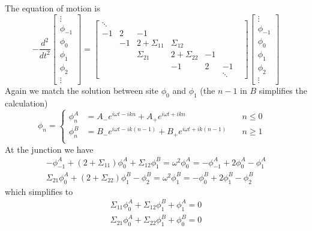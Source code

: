 \documentclass{article}
\begin{document}
The equation of motion is
\begin{equation}
-\frac{d^2}{dt^2} 
\begin{bmatrix}
\vdots\\
\phi_{-1}\\
\phi_0\\
\phi_1\\
\phi_2\\
\vdots 
\end{bmatrix}
 =  
\begin{bmatrix}
\ddots & & & & &\\
-1 & 2 & -1 & & &  \\
&-1 & 2 + \Sigma_{11} & \Sigma_{12} & & &\\ 
& & \Sigma_{21} & 2 + \Sigma_{22} & -1 & &\\
& & & -1 & 2 & -1 & \\
& & & & & \ddots &
\end{bmatrix}
\begin{bmatrix}
\vdots\\
\phi_{-1}\\
\phi_0\\
\phi_1\\
\phi_2\\
\vdots 
\end{bmatrix}
\end{equation}
Again we match the solution between site $\phi_0$ and $\phi_1$ (the $n -1$ in $B$ simplifies the calculation)
\begin{equation}
\phi_n
= \left\lbrace
  \begin{aligned}
    \phi_n^A &= A_{-} e^{i \omega t  - ikn}  + A_{+} e^{i \omega t  + ikn}  & \quad  n \le 0 \\
    \phi_n^B &= B_{-} e^{i \omega t  - ik(n-1)}  + B_{+} e^{i \omega t  + ik(n-1)} & \quad n \ge 1 \\
  \end{aligned} \right. 
 \quad 
\end{equation}
At the junction we have
\begin{equation}
\begin{aligned}
- \phi_{-1}^A + ( 2+ \Sigma_{11} ) \phi_{0}^A + \Sigma_{12} \phi_1^B =  \omega^2 \phi_0^A = - \phi_{-1}^A + 2 \phi_{0}^A - \phi_1^A\\
\Sigma_{21} \phi_0^A + ( 2 + \Sigma_{22}) \phi_1^B - \phi_2^B = \omega^2 \phi_1^B  = - \phi_0^B + 2 \phi_1^B - \phi_2^B 
\end{aligned}
\end{equation}
which simplifies to
\begin{equation}
\begin{aligned}
\Sigma_{11} \phi_0^A + \Sigma_{12} \phi_1^B + \phi_1^A  =0 \\
\Sigma_{21} \phi_0^A + \Sigma_{22} \phi_1^B + \phi_0^B = 0 \\
\end{aligned}
\end{equation}
\end{document}
